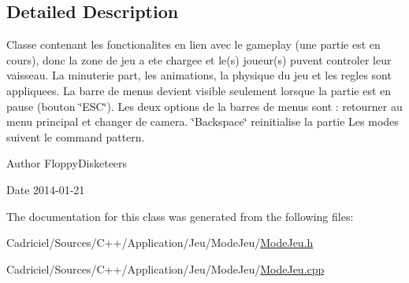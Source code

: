 \subsection{Detailed Description}
Classe contenant les fonctionalites en lien avec le gameplay (une partie est en cours), donc la zone de jeu a ete chargee et le(s) joueur(s) puvent controler leur vaisseau. La minuterie part, les animations, la physique du jeu et les regles sont appliquees. La barre de menus devient visible seulement lorsque la partie est en pause (bouton \char`\"{}\-E\-S\-C\char`\"{}). Les deux options de la barres de menus sont \-: retourner au menu principal et changer de camera. \char`\"{}\-Backspace\char`\"{} reinitialise la partie Les modes suivent le command pattern. 

\begin{DoxyAuthor}{Author}
Floppy\-Disketeers 
\end{DoxyAuthor}
\begin{DoxyDate}{Date}
2014-\/01-\/21 
\end{DoxyDate}


The documentation for this class was generated from the following files\-:\begin{DoxyCompactItemize}
\item 
Cadriciel/\-Sources/\-C++/\-Application/\-Jeu/\-Mode\-Jeu/\hyperlink{_mode_jeu_8h}{Mode\-Jeu.\-h}\item 
Cadriciel/\-Sources/\-C++/\-Application/\-Jeu/\-Mode\-Jeu/\hyperlink{_mode_jeu_8cpp}{Mode\-Jeu.\-cpp}\end{DoxyCompactItemize}
